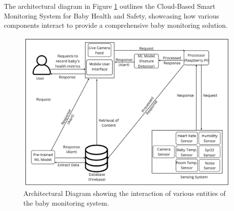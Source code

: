 \documentclass[12pt,a4paper]{report}
\begin{document}
The architectural diagram in Figure \ref{fig:architecture} outlines the Cloud-Based Smart Monitoring System for Baby Health and Safety, showcasing how various components interact to provide a comprehensive baby monitoring solution.
\begin{figure}[h]
  \centering
  \includegraphics[scale=0.55]{./pic/finarch.png}
  \caption{Architectural Diagram showing the interaction of various entities of the baby monitoring system.}
  \label{fig:architecture}
\end{figure}
\end{document}
